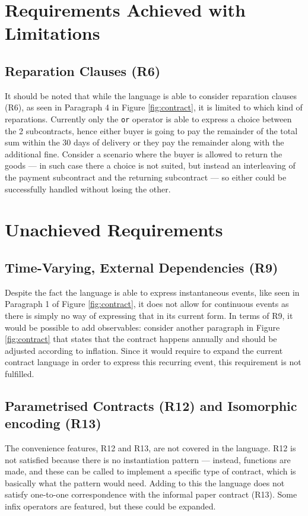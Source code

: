 \documentclass{ituthesis}
\begin{document}
\section{Requirements Achieved with Limitations}

\subsection{Reparation Clauses (R6)}
It should be noted that while the language is able to consider reparation clauses (R6), as seen in Paragraph 4 in Figure \ref{fig:contract}, it is limited to which kind of reparations. Currently only the \texttt{or} operator is able to express a choice between the 2 subcontracts, hence either buyer is going to pay the remainder of the total sum within the 30 days of delivery or they pay the remainder along with the additional fine. Consider a scenario where the buyer is allowed to return the goods --- in such case there a choice is not suited, but instead an interleaving of the payment subcontract and the returning subcontract --- so either could be successfully handled without losing the other.

\section{Unachieved Requirements}

\subsection{Time-Varying, External Dependencies (R9)}
Despite the fact the language is able to express instantaneous events, like seen in Paragraph 1 of Figure \ref{fig:contract}, it does not allow for continuous events as there is simply no way of expressing that in its current form. In terms of R9, it would be possible to add observables: consider another paragraph in Figure \ref{fig:contract} that states that the contract happens annually and should be adjusted according to inflation. Since it would require to expand the current contract language in order to express this recurring event, this requirement is not fulfilled.

\subsection{Parametrised Contracts (R12) and Isomorphic encoding (R13)}
The convenience features, R12 and R13, are not covered in the language. R12 is not satisfied because there is no instantiation pattern --- instead, functions are made, and these can be called to implement a specific type of contract, which is basically what the pattern would need. Adding to this the language does not satisfy one-to-one correspondence with the informal paper contract (R13). Some infix operators are featured, but these could be expanded.
\end{document}
